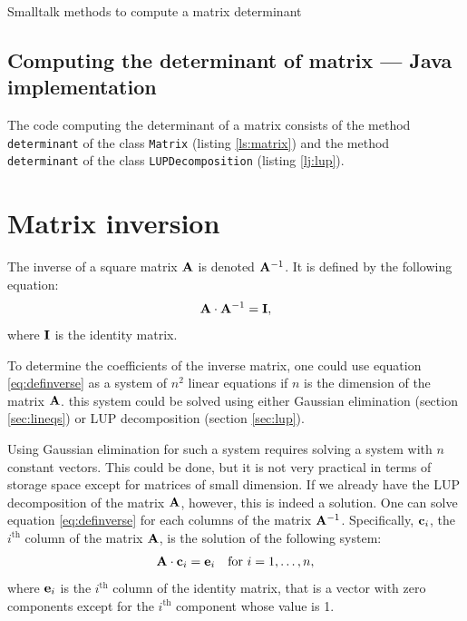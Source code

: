 \documentclass[twoside]{book}
\begin{document}
\begin{listing} Smalltalk methods to compute a matrix determinant \label{ls:determinant}


\end{listing}


\subsection{Computing the determinant of matrix --- Java implementation}
The code computing the determinant of a matrix consists of the
method {\tt determinant} of the class {\tt Matrix} (\cf listing
\ref{ls:matrix}) and the method {\tt determinant} of the class
{\tt LUPDecomposition} (\cf listing \ref{lj:lup}).


\section{Matrix inversion}
\label{sec:matrixinversion} The inverse of a square matrix ${\bf
A}$ is denoted ${\bf A}^{-1}$. It is defined by the following
equation:
\begin{equation}
\label{eq:definverse} {\bf A}\cdot{\bf A}^{-1}={\bf I},
\end{equation}
where ${\bf I}$ is the identity matrix.

To determine the coefficients of the inverse matrix, one could use
equation \ref{eq:definverse} as a system of $n^2$ linear equations
if $n$ is the dimension of the matrix ${\bf A}$. this system could
be solved using either Gaussian elimination (\cf section
\ref{sec:lineqs}) or LUP decomposition (\cf section
\ref{sec:lup}).

Using Gaussian elimination for such a system requires solving a
system with $n$ constant vectors. This could be done, but it is
not very practical in terms of storage space except for matrices
of small dimension. If we already have the LUP decomposition of
the matrix ${\bf A}$, however, this is indeed a solution. One can
solve equation \ref{eq:definverse} for each columns of the matrix
${\bf A}^{-1}$. Specifically, ${\bf c}_i$, the $i^{\mathop{th}}$
column of the matrix ${\bf A}$, is the solution of the following
system:
\begin{equation}
  {\bf A}\cdot{\bf c}_i={\bf e}_i\mbox{\quad for $i=1,\ldots,n$},
\end{equation}
where ${\bf e}_i$ is the $i^{\mathop{th}}$ column of the identity
matrix, that is a vector with zero components except for the
$i^{\mathop{th}}$ component whose value is 1.
\end{document}
